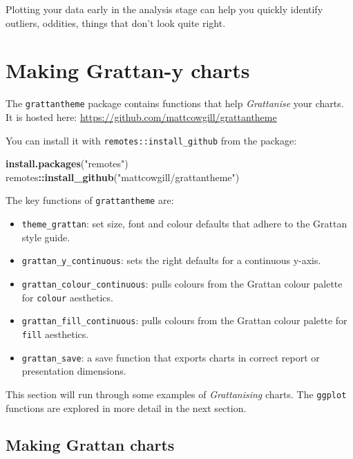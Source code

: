 \documentclass[
]{book}
\newenvironment{Shaded}{\begin{snugshade}}{\end{snugshade}}
\newcommand{\KeywordTok}[1]{\textcolor[rgb]{0.13,0.29,0.53}{\textbf{#1}}}
\newcommand{\NormalTok}[1]{#1}
\newcommand{\OperatorTok}[1]{\textcolor[rgb]{0.81,0.36,0.00}{\textbf{#1}}}
\newcommand{\StringTok}[1]{\textcolor[rgb]{0.31,0.60,0.02}{#1}}
\providecommand{\tightlist}{%
  \setlength{\itemsep}{0pt}\setlength{\parskip}{0pt}}
\begin{document}
Plotting your data early in the analysis stage can help you quickly identify outliers, oddities, things that don't look quite right.

\hypertarget{making-grattan-y-charts}{%
\section{Making Grattan-y charts}\label{making-grattan-y-charts}}

The \texttt{grattantheme} package contains functions that help \emph{Grattanise} your charts. It is hosted here: \url{https://github.com/mattcowgill/grattantheme}

You can install it with \texttt{remotes::install\_github} from the package:

\begin{Shaded}
\begin{Highlighting}[]
\KeywordTok{install.packages}\NormalTok{(}\StringTok{"remotes"}\NormalTok{)}
\NormalTok{remotes}\OperatorTok{::}\KeywordTok{install\_github}\NormalTok{(}\StringTok{"mattcowgill/grattantheme"}\NormalTok{)}
\end{Highlighting}
\end{Shaded}

The key functions of \texttt{grattantheme} are:

\begin{itemize}
\tightlist
\item
  \texttt{theme\_grattan}: set size, font and colour defaults that adhere to the Grattan style guide.
\item
  \texttt{grattan\_y\_continuous}: sets the right defaults for a continuous y-axis.
\item
  \texttt{grattan\_colour\_continuous}: pulls colours from the Grattan colour palette for \texttt{colour} aesthetics.
\item
  \texttt{grattan\_fill\_continuous}: pulls colours from the Grattan colour palette for \texttt{fill} aesthetics.
\item
  \texttt{grattan\_save}: a save function that exports charts in correct report or presentation dimensions.
\end{itemize}

This section will run through some examples of \emph{Grattanising} charts. The \texttt{ggplot} functions are explored in more detail in the next section.

\hypertarget{making-grattan-charts}{%
\subsection{Making Grattan charts}\label{making-grattan-charts}}
\end{document}
